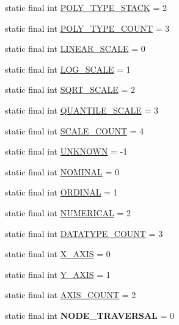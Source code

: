 \begin{DoxyCompactItemize}
\item 
static final int \hyperlink{interfaceprefuse_1_1_constants_a70ce90ce56cf918c622f73f000e2e04a}{\-P\-O\-L\-Y\-\_\-\-T\-Y\-P\-E\-\_\-\-S\-T\-A\-C\-K} = 2
\item 
static final int \hyperlink{interfaceprefuse_1_1_constants_a27561744b0c94fbadf7e4e71e1900d60}{\-P\-O\-L\-Y\-\_\-\-T\-Y\-P\-E\-\_\-\-C\-O\-U\-N\-T} = 3
\item 
static final int \hyperlink{interfaceprefuse_1_1_constants_ab54b5d45605aa12251d02630a8053175}{\-L\-I\-N\-E\-A\-R\-\_\-\-S\-C\-A\-L\-E} = 0
\item 
static final int \hyperlink{interfaceprefuse_1_1_constants_afa0c75e806145930d22d15275e97af1a}{\-L\-O\-G\-\_\-\-S\-C\-A\-L\-E} = 1
\item 
static final int \hyperlink{interfaceprefuse_1_1_constants_a70b7cc2c717b3794b4be67ae4e5c3f67}{\-S\-Q\-R\-T\-\_\-\-S\-C\-A\-L\-E} = 2
\item 
static final int \hyperlink{interfaceprefuse_1_1_constants_a1a7430af31ee161809704331ec8a6e9d}{\-Q\-U\-A\-N\-T\-I\-L\-E\-\_\-\-S\-C\-A\-L\-E} = 3
\item 
static final int \hyperlink{interfaceprefuse_1_1_constants_a90bcc12a5126e15cc4f8af3ba918bd1c}{\-S\-C\-A\-L\-E\-\_\-\-C\-O\-U\-N\-T} = 4
\item 
static final int \hyperlink{interfaceprefuse_1_1_constants_a9fd27ed629dabf0df13c45e651716034}{\-U\-N\-K\-N\-O\-W\-N} = -\/1
\item 
static final int \hyperlink{interfaceprefuse_1_1_constants_abc57a9bb50302e46274bb174392bb2e9}{\-N\-O\-M\-I\-N\-A\-L} = 0
\item 
static final int \hyperlink{interfaceprefuse_1_1_constants_a3cf3a628869c14a52340c5680992f605}{\-O\-R\-D\-I\-N\-A\-L} = 1
\item 
static final int \hyperlink{interfaceprefuse_1_1_constants_a1202927c3386b9bd213fe8bba07cb158}{\-N\-U\-M\-E\-R\-I\-C\-A\-L} = 2
\item 
static final int \hyperlink{interfaceprefuse_1_1_constants_a55783ae425983051a57bbade12326574}{\-D\-A\-T\-A\-T\-Y\-P\-E\-\_\-\-C\-O\-U\-N\-T} = 3
\item 
static final int \hyperlink{interfaceprefuse_1_1_constants_afe85a52e151fb9353498b4310a9cb2c8}{\-X\-\_\-\-A\-X\-I\-S} = 0
\item 
static final int \hyperlink{interfaceprefuse_1_1_constants_a5e5dd3c5e738bc44a304d1f6a24a6100}{\-Y\-\_\-\-A\-X\-I\-S} = 1
\item 
static final int \hyperlink{interfaceprefuse_1_1_constants_a09cf6059e502acd9216360f040e345bb}{\-A\-X\-I\-S\-\_\-\-C\-O\-U\-N\-T} = 2
\item 
\hypertarget{interfaceprefuse_1_1_constants_aed11f66736aa4668226bdf1aca82fd10}{static final int {\bfseries \-N\-O\-D\-E\-\_\-\-T\-R\-A\-V\-E\-R\-S\-A\-L} = 0}\label{interfaceprefuse_1_1_constants_aed11f66736aa4668226bdf1aca82fd10}


\end{DoxyCompactItemize}

